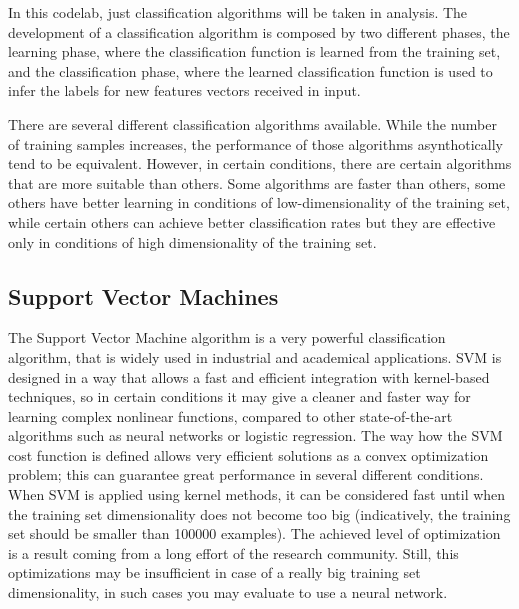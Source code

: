 \documentclass[aps,letterpaper,10pt]{revtex4}
\begin{document}
In this codelab, just classification algorithms will be taken in analysis. The development of a classification algorithm is composed by two different phases, the learning phase, where the classification function is learned from the training set, and the classification phase, where the learned classification function is used to infer the labels for new features vectors received in input.

There are several different classification algorithms available. While the number of training samples increases, the performance of those algorithms asynthotically tend to be equivalent. However, in certain conditions, there are certain algorithms that are more suitable than others. Some algorithms are faster than others, some others have better learning in conditions of low-dimensionality of the training set, while certain others can achieve better classification rates but they are effective only in conditions of high dimensionality of the training set.

\subsection{Support Vector Machines}
The Support Vector Machine algorithm is a very powerful classification algorithm, that is widely used in industrial and academical applications. SVM is designed in a way that allows a fast and efficient integration with kernel-based techniques, so in certain conditions it may give a cleaner and faster way for learning complex nonlinear functions, compared to other state-of-the-art algorithms such as neural networks or logistic regression. The way how the SVM cost function is defined allows very efficient solutions as a convex optimization problem; this can guarantee great performance in several different conditions. When SVM is applied using kernel methods, it can be considered fast until when the training set dimensionality does not become too big (indicatively, the training set should be smaller than 100000 examples). The achieved level of optimization is a result coming from a long effort of the research community. Still, this optimizations may be insufficient in case of a really big training set dimensionality, in such cases you may evaluate to use a neural network.
\end{document}

